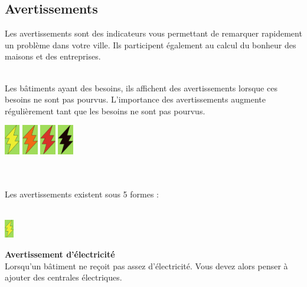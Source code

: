 \documentclass[11pt]{report}
\begin{document}
\newpage
\subsection{Avertissements}
Les avertissements sont des indicateurs vous permettant de remarquer rapidement un problème dans votre ville. Ils participent également au calcul du bonheur des maisons et des entreprises.\\
\\
\begin{minipage}{0.7\textwidth}
	Les bâtiments ayant des besoins, ils affichent des avertissements lorsque ces besoins ne sont pas pourvus. L'importance des avertissements augmente régulièrement tant que les besoins ne sont pas pourvus.
\end{minipage}
\begin{minipage}{0.25\textwidth}
	\includegraphics[height=50px]{electricity_warning}
	\includegraphics[height=50px]{warning_2}
	\includegraphics[height=50px]{warning_3}
	\includegraphics[height=50px]{warning_4}
\end{minipage}
\\
\\
Les avertissements existent sous 5 formes :\\
\\
\begin{minipage}{0.1\textwidth}
	\begin{center}
		\includegraphics[height=30px]{electricity_warning}
	\end{center}
\end{minipage}
\begin{minipage}{0.85\textwidth}
	\textbf{Avertissement d'électricité}\\
	Lorsqu'un bâtiment ne reçoit pas assez d'électricité. Vous devez alors penser à ajouter des centrales électriques.
\end{minipage}
\end{document}

